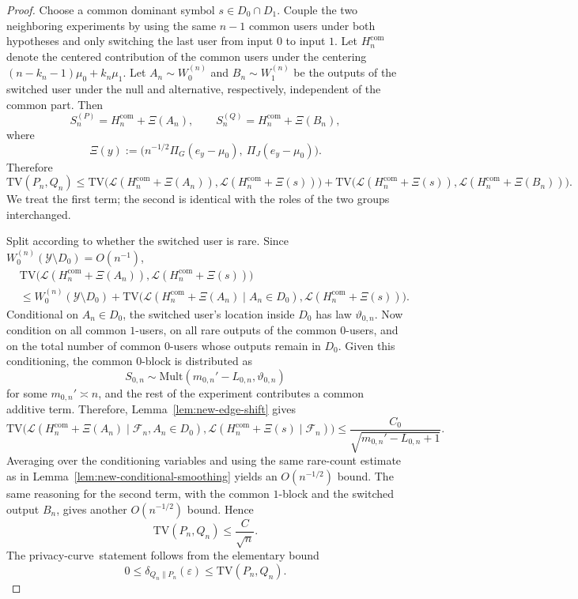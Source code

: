 \documentclass{article}
\newcommand{\TV}{\mathrm{TV}}
\newcommand{\Mult}{\mathrm{Mult}}
\newcommand{\1}{\mathbf 1}
\newcommand{\privacycurve}{\mbox{privacy-curve}}
\begin{document}
\begin{proof}
Choose a common dominant symbol $s\in D_0\cap D_1$. Couple the two neighboring experiments by using the same
$n-1$ common users under both hypotheses and only switching the last user from input $0$ to input $1$. Let
$H_n^{\mathrm{com}}$ denote the centered contribution of the common users under the centering
$(n-k_n-1)\mu_0+k_n\mu_1$. Let $A_n\sim W_0^{(n)}$ and $B_n\sim W_1^{(n)}$ be the outputs of the switched user under the
null and alternative, respectively, independent of the common part. Then
\[
S_n^{(P)}=H_n^{\mathrm{com}}+\Xi(A_n),
\qquad
S_n^{(Q)}=H_n^{\mathrm{com}}+\Xi(B_n),
\]
where
\[
\Xi(y):=\bigl(n^{-1/2}\Pi_G(e_y-\mu_0),\ \Pi_J(e_y-\mu_0)\bigr).
\]
Therefore
\[
\TV(P_n,Q_n)
\le
\TV\bigl(\mathcal L(H_n^{\mathrm{com}}+\Xi(A_n)),\mathcal L(H_n^{\mathrm{com}}+\Xi(s))\bigr)
+
\TV\bigl(\mathcal L(H_n^{\mathrm{com}}+\Xi(s)),\mathcal L(H_n^{\mathrm{com}}+\Xi(B_n))\bigr).
\]
We treat the first term; the second is identical with the roles of the two groups interchanged.

Split according to whether the switched user is rare. Since $W_0^{(n)}(\mathcal Y\setminus D_0)=O(n^{-1})$,
\begin{align*}
&\TV\bigl(\mathcal L(H_n^{\mathrm{com}}+\Xi(A_n)),\mathcal L(H_n^{\mathrm{com}}+\Xi(s))\bigr) \\
&\le W_0^{(n)}(\mathcal Y\setminus D_0)
+\TV\bigl(\mathcal L(H_n^{\mathrm{com}}+\Xi(A_n)\mid A_n\in D_0),\mathcal L(H_n^{\mathrm{com}}+\Xi(s))\bigr).
\end{align*}
Conditional on $A_n\in D_0$, the switched user's location inside $D_0$ has law $\vartheta_{0,n}$. Now condition on all
common $1$-users, on all rare outputs of the common $0$-users, and on the total number of common $0$-users whose
outputs remain in $D_0$. Given this conditioning, the common $0$-block is distributed as
\[
S_{0,n}\sim \Mult(m_{0,n}'-L_{0,n},\vartheta_{0,n})
\]
for some $m_{0,n}'\asymp n$, and the rest of the experiment contributes a common additive term. Therefore,
Lemma~\ref{lem:new-edge-shift} gives
\[
\TV\bigl(\mathcal L(H_n^{\mathrm{com}}+\Xi(A_n)\mid \mathcal F_n,A_n\in D_0),\mathcal L(H_n^{\mathrm{com}}+\Xi(s)\mid\mathcal F_n)\bigr)
\le \frac{C_0}{\sqrt{m_{0,n}'-L_{0,n}+1}}.
\]
Averaging over the conditioning variables and using the same rare-count estimate as in
Lemma~\ref{lem:new-conditional-smoothing} yields an $O(n^{-1/2})$ bound. The same reasoning for the second term,
with the common $1$-block and the switched output $B_n$, gives another $O(n^{-1/2})$ bound. Hence
\[
\TV(P_n,Q_n)\le \frac{C}{\sqrt n}.
\]
The \privacycurve\ statement follows from the elementary bound
\[
0\le \delta_{Q_n\|P_n}(\varepsilon)\le \TV(P_n,Q_n).
\]
\end{proof}
\end{document}
